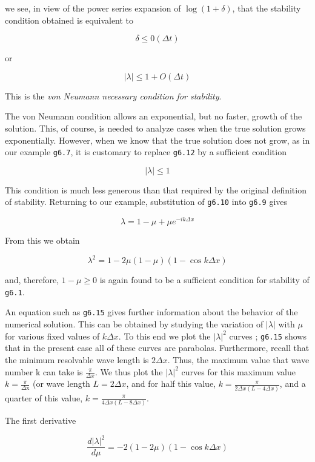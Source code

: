 we see, in view of the power series expansion of
\(\log\left( 1 + \delta \right)\), that the stability condition obtained
is equivalent to

\[\delta \leq 0\left( \Delta t \right)\]

or

    {\[|\lambda| \leq 1 + O (\Delta t)\]}

This is the \emph{von Neumann necessary condition for stability}.

The von Neumann condition allows an exponential, but no faster, growth
of the solution. This, of course, is needed to analyze cases when the
true solution grows exponentially. However, when we know that the true
solution does not grow, as in our example \texttt{g6.7}, it is customary
to replace \texttt{g6.12} by a sufficient condition

    {\[|\lambda| \leq 1\]}

This condition is much less generous than that required by the original
definition of stability. Returning to our example, substitution of
\texttt{g6.10} into \texttt{g6.9} gives

    {\[\lambda = 1 - \mu + \mu e^{-ik\Delta x}\]}

From this we obtain

    {\[\lambda^{2} =1 - 2\mu\left( 1 - \mu \right)\left( 1 - \cos{k\Delta x} \right)\]}

and, therefore, \(1 - \mu \geq 0 \) is again found to be a sufficient
condition for stability of \texttt{g6.1}.

An equation such as \texttt{g6.15} gives further information about the
behavior of the numerical solution. This can be obtained by studying the
variation of \(|\lambda|\) with \(\mu\) for various fixed values of
\(k\Delta x\). To this end we plot the \(|\lambda|^{2}\) curves ;
\texttt{g6.15} shows that in the present case all of these curves are
parabolas. Furthermore, recall that the minimum resolvable wave length
is \(2 \Delta x\). Thus, the maximum value that wave number k can take
is \(\frac{\pi}{\Delta x}\). We thus plot the \(|\lambda|^{2}\) curves
for this maximum value \(k = \frac{\pi}{\Delta\text{x}}\) (or wave
length \(L = 2\Delta x\), and for half this value,
\(k = \frac{\pi}{2\Delta x\left( L - 4\Delta x \right)}\), and a quarter
of this value,
\(k = \frac{\pi}{4\Delta x\left( L - 8\Delta x \right)}\).

The first derivative

\[\frac{d|\lambda|^2}{d\mu} = - 2( 1 - 2\mu)( 1 - \cos{k \Delta x} )\]

